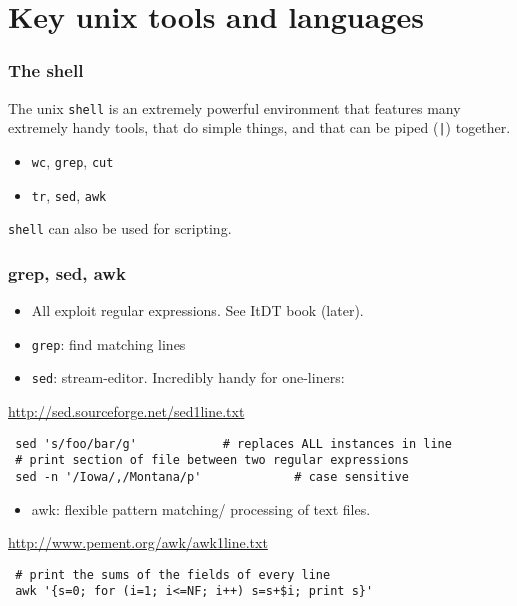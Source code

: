 \documentclass{beamer}
\begin{document}
\section{Key unix tools and languages}
\label{sec-1}
\begin{frame}
\frametitle{The shell}
\label{sec-1-1}


The unix \texttt{shell} is an extremely powerful environment that features many 
extremely handy tools, that do simple things, and that can be piped (\texttt{|}) 
together.

\begin{itemize}
\item \texttt{wc}, \texttt{grep}, \texttt{cut}
\item \texttt{tr}, \texttt{sed}, \texttt{awk}
\end{itemize}

\texttt{shell} can also be used for scripting.
\end{frame}
\begin{frame}[fragile]
\frametitle{grep, sed, awk}
\label{sec-1-2}


\begin{itemize}
\item All exploit regular expressions. See ItDT book (later).
\item \texttt{grep}: find matching lines
\item \texttt{sed}: stream-editor.  Incredibly handy for one-liners:
\end{itemize}
\href{http://sed.sourceforge.net/sed1line.txt}{http://sed.sourceforge.net/sed1line.txt}

\begin{verbatim}
 sed 's/foo/bar/g'            # replaces ALL instances in line
 # print section of file between two regular expressions
 sed -n '/Iowa/,/Montana/p'             # case sensitive
\end{verbatim}

\begin{itemize}
\item awk: flexible pattern matching/ processing of text
  files.
\end{itemize}
\href{http://www.pement.org/awk/awk1line.txt}{http://www.pement.org/awk/awk1line.txt}
\begin{verbatim}
 # print the sums of the fields of every line
 awk '{s=0; for (i=1; i<=NF; i++) s=s+$i; print s}'
\end{verbatim}
\end{frame}
\end{document}
